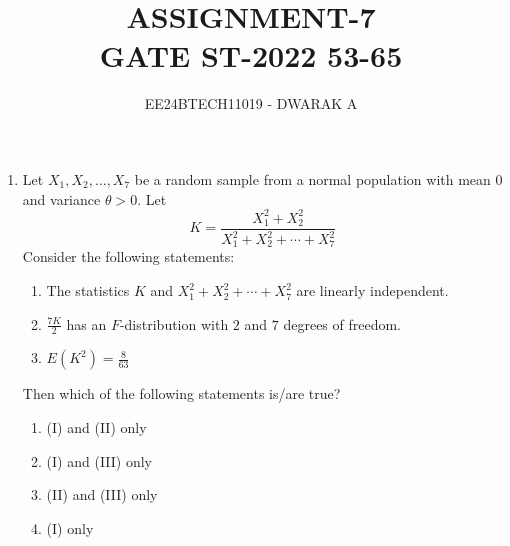 \documentclass[journal]{IEEEtran}
\begin{document}

\vspace{3cm}

\title{\textbf{ASSIGNMENT-7\\GATE ST-2022 53-65}}
\author{EE24BTECH11019 - DWARAK A}
\maketitle

\renewcommand{\thefigure}{\theenumi}
\renewcommand{\thetable}{\theenumi}

\begin{enumerate}

\subsection*{Q.36 - Q.65 carry TWO marks each}

    \item Let $X_1, X_2, \dots, X_7$ be a random sample from a normal population with mean $0$ and variance $\theta > 0$. Let $$K = \frac{X_1^2+X_2^2}{X_1^2+X_2^2+\cdots+X_7^2}$$ Consider the following statements:
        \begin{enumerate}[label = (\Roman*)]
            \item The statistics $K$ and $X_1^2+X_2^2+\cdots+X_7^2$ are linearly independent.
            \item $\frac{7K}{2}$ has an $F$-distribution with $2$ and $7$ degrees of freedom.
            \item $E(K^2)=\frac{8}{63}$
        \end{enumerate}
        Then which of the following statements is/are true?
        \begin{enumerate}
            \item (I) and (II) only 
            \item (I) and (III) only 
            \item (II) and (III) only 
            \item (I) only 
        \end{enumerate}


\end{enumerate}
\end{document}
